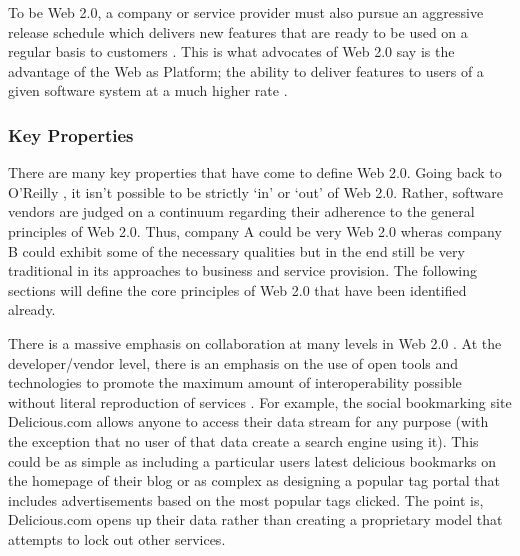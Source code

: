 \documentclass[12pt,oneside,letterpaper]{article}
\begin{document}
To be Web 2.0, a company or service provider must also pursue an aggressive
release schedule which delivers new features that are ready to be used on a
regular basis to customers \citep{miller2005}.  This is what advocates of Web
2.0 say is the advantage of the Web as Platform; the ability to deliver features
to users of a given software system at a much higher rate \citep{oreilly2007}.

\subsubsection{Key Properties}

There are many key properties that have come to define Web 2.0.  Going back to
O'Reilly \citeyearpar{oreilly2007}, it isn't possible to be strictly `in' or
`out' of Web 2.0.  Rather, software vendors are judged on a continuum regarding
their adherence to the general principles of Web 2.0.  Thus, company A could be
very Web 2.0 wheras company B could exhibit some of the necessary qualities but
in the end still be very traditional in its approaches to business and service
provision.  The following sections will define the core principles of Web 2.0
that have been identified already.

There is a massive emphasis on collaboration at many levels in Web 2.0
\citep{oreilly2007}.  At the developer/vendor level, there is an emphasis on the
use of open tools and technologies to promote the maximum amount of
interoperability possible without literal reproduction of services
\citep{miller2005}.  For example, the social bookmarking site Delicious.com
allows anyone to access their data stream for any purpose (with the exception
that no user of that data create a search engine using it).  This could be as
simple as including a particular users latest delicious bookmarks on the
homepage of their blog or as complex as designing a popular tag portal that
includes advertisements based on the most popular tags clicked.  The point is,
Delicious.com opens up their data rather than creating a proprietary model that
attempts to lock out other services.
\end{document}
